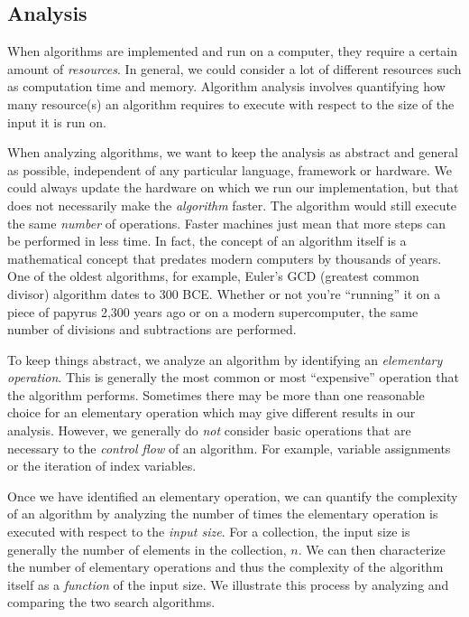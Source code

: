 

\subsection{Analysis}

When algorithms are implemented and run on a computer, they require a
certain amount of \emph{resources}.  In general, we could consider a lot
of different resources such as computation time and memory.  Algorithm
analysis involves quantifying how many resource(s) an algorithm requires
to execute with respect to the size of the input it is run on.

When analyzing algorithms, we want to keep the analysis as abstract and 
general as possible, independent of any particular language, framework or
hardware.  We could always update the hardware on which we run our implementation, 
but that does not necessarily make the  
\emph{algorithm} faster.  The algorithm would still execute the same
\emph{number} of operations.  Faster machines just mean that more
steps can be performed in less time.  In
fact, the concept of an algorithm itself is a mathematical concept that
predates modern computers by thousands of years.  One of the oldest algorithms,
for example, Euler's GCD (greatest common divisor) algorithm dates to 300
BCE.  Whether or not you're ``running'' it on a piece of papyrus 2,300 years
ago or on a modern supercomputer, the same number of divisions and subtractions
are performed.

To keep things abstract, we analyze an algorithm by identifying
an  \emph{elementary operation}.  This is generally the most common or most
``expensive'' operation that the algorithm performs.  Sometimes there may be more
than one reasonable choice for an elementary operation which may give different results in our analysis.  However, we generally do \emph{not} consider basic operations
that are necessary to the \emph{control flow} of an algorithm.  For example, 
variable assignments or the iteration of index variables.

Once we have identified an elementary operation, we can quantify the complexity
of an algorithm by analyzing the number of times the elementary operation is
executed with respect to the \emph{input size}.  For a collection, the input
size is generally the number of elements in the collection, $n$.  We can
then characterize the number of elementary operations and thus the complexity
of the algorithm itself as a \emph{function} of the input size.  We illustrate
this process by analyzing and comparing the two search algorithms.

